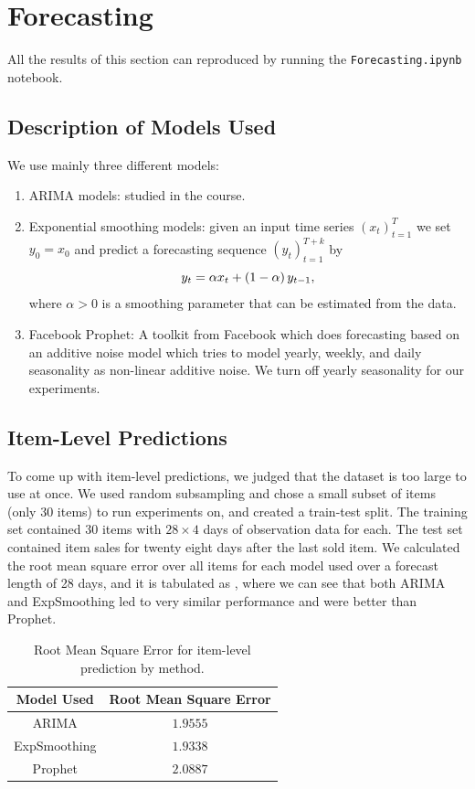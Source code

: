 \documentclass[12pt]{article}
\begin{document}
\section{Forecasting}
All the results of this section can reproduced by running the \texttt{Forecasting.ipynb} notebook.

\subsection{Description of Models Used}
We use mainly three different models:
\begin{enumerate}
  \item ARIMA models: studied in the course.
  \item Exponential smoothing models: given an input time series $(x_{t})_{t=1}^{T}$ we set $y_0 = x_0$ and predict a forecasting sequence $(y_{t})_{t=1}^{T+k}$ by
  \[ y_{t} = \alpha x_{t} + \left ( 1 - \alpha \right ) y_{t-1},  \]
  where $\alpha > 0$ is a smoothing parameter that can be estimated from the data.
  \item Facebook Prophet: A toolkit from Facebook which does forecasting based on an additive noise model which tries to model yearly, weekly, and daily seasonality as non-linear additive noise. We turn off yearly seasonality for our experiments.
\end{enumerate}

\subsection{Item-Level Predictions}
To come up with item-level predictions, we judged that the dataset is too large to use at once. We used random subsampling and chose a small subset of items (only $30$ items) to run experiments on, and created a train-test split. The training set contained $30$ items with $28 \times 4$ days of observation data for each. The test set contained item sales for twenty eight days after the last sold item. We calculated the root mean square error over all items for each model used over a forecast length of 28 days, and it is tabulated as , where we can see that both ARIMA and ExpSmoothing led to very similar performance and were better than Prophet.

\begin{table}[]
  \centering
  \caption{Root Mean Square Error for item-level prediction by method.}
  \label{tab:rmse-item}
  \begin{tabular}{cc}
  \hline
  Model Used   & Root Mean Square Error \\ \hline
  ARIMA        & $1.9555$               \\
  ExpSmoothing & $1.9338$               \\
  Prophet      & $2.0887$               \\ \hline
  \end{tabular}
  \end{table}
\end{document}
